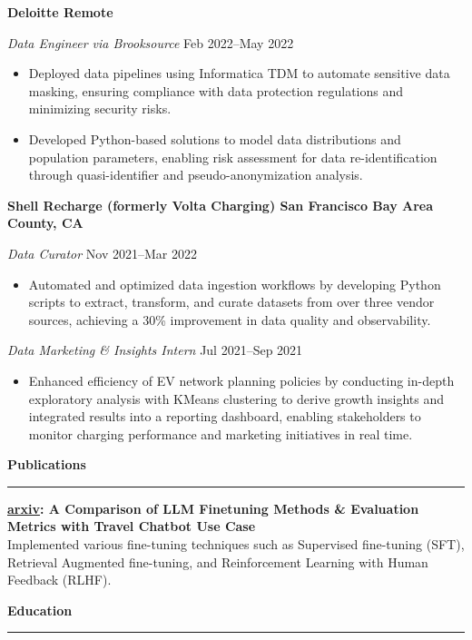 \documentclass[letterpaper,10pt]{article}
\newcommand{\resumesection}[1]{
  \vspace{4pt}
  \noindent\textbf{\Large #1} \\
  \noindent\rule{\linewidth}{0.2pt}
  \vspace{-4pt}
}
\begin{document}
\textbf{Deloitte \hfill Remote}\par
\textit{Data Engineer via Brooksource} \hfill  Feb 2022--May 2022
\begin{itemize}[leftmargin=0.15in, itemsep=0pt, parsep=0pt, topsep=0pt]
    \item Deployed data pipelines using Informatica TDM to automate sensitive data masking, ensuring compliance with data protection regulations and minimizing security risks.
    \item Developed Python-based solutions to model data distributions and population parameters, enabling risk assessment for data re-identification through quasi-identifier and pseudo-anonymization analysis.
\end{itemize}

\textbf{Shell Recharge (formerly Volta Charging) \hfill San Francisco Bay Area County, CA}\par
\textit{Data Curator} \hfill Nov 2021--Mar 2022
\begin{itemize}[leftmargin=0.15in, itemsep=0pt, parsep=0pt, topsep=0pt]
    \item Automated and optimized data ingestion workflows by developing Python scripts to extract, transform, and curate datasets from over three vendor sources, achieving a 30\% improvement in data quality and observability.
\end{itemize}

\textit{Data Marketing \& Insights Intern} \hfill Jul 2021--Sep 2021
\begin{itemize}[leftmargin=0.15in, itemsep=0pt, parsep=0pt, topsep=0pt]
    \item Enhanced efficiency of EV network planning policies by conducting in-depth exploratory analysis with KMeans clustering to derive growth insights and integrated results into a reporting dashboard, enabling stakeholders to monitor charging performance and marketing initiatives in real time.
\end{itemize}

\resumesection{Publications}

\textbf{\href{https://arxiv.org/abs/2408.03562}{arxiv}: A Comparison of LLM Finetuning Methods \& Evaluation Metrics with Travel Chatbot Use Case} \\
Implemented various fine-tuning techniques such as Supervised fine-tuning (SFT), Retrieval Augmented fine-tuning, and Reinforcement Learning with Human Feedback (RLHF).

\resumesection{Education}
\end{document}

